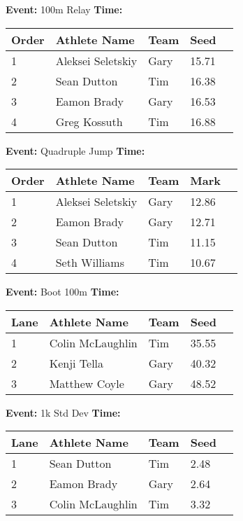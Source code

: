 \documentclass[10pt]{article}
\begin{document}
\textbf{Event:} 100m Relay \quad \textbf{Time:}  

\vspace{1em}
\begin{tabular}{@{}lllll@{}}
\toprule

\textbf{Order} & \textbf{Athlete Name} & \textbf{Team} & \textbf{Seed} \\
\midrule
1 & Aleksei Seletskiy & Gary & 15.71 &\\
2 & Sean Dutton & Tim & 16.38 &\\
3 & Eamon Brady & Gary & 16.53 &\\
4 & Greg Kossuth & Tim & 16.88 &\\
\bottomrule
\end{tabular}
\vspace{2.5em}


\textbf{Event:} Quadruple Jump \quad \textbf{Time:}  

\vspace{1em}
\begin{tabular}{@{}lllll@{}}
\toprule

\textbf{Order} & \textbf{Athlete Name} & \textbf{Team} & \textbf{Mark} \\
\midrule
1 & Aleksei Seletskiy & Gary & 12.86 &\\
2 & Eamon Brady & Gary & 12.71 &\\
3 & Sean Dutton & Tim & 11.15 &\\
4 & Seth Williams & Tim & 10.67 &\\
\bottomrule
\end{tabular}
\vspace{2.5em}


\textbf{Event:} Boot 100m \quad \textbf{Time:}  

\vspace{1em}
\begin{tabular}{@{}lllll@{}}
\toprule

\textbf{Lane} & \textbf{Athlete Name} & \textbf{Team} & \textbf{Seed} \\
\midrule
1 & Colin McLaughlin & Tim & 35.55 &\\
2 & Kenji Tella & Gary & 40.32 &\\
3 & Matthew Coyle & Gary & 48.52 &\\
\bottomrule
\end{tabular}
\vspace{2.5em}


\textbf{Event:} 1k Std Dev \quad \textbf{Time:}  

\vspace{1em}
\begin{tabular}{@{}lllll@{}}
\toprule

\textbf{Lane} & \textbf{Athlete Name} & \textbf{Team} & \textbf{Seed} \\
\midrule
1 & Sean Dutton & Tim & 2.48 &\\
2 & Eamon Brady & Gary & 2.64 &\\
3 & Colin McLaughlin & Tim & 3.32 &\\
\bottomrule
\end{tabular}
\vspace{2.5em}
\end{document}
